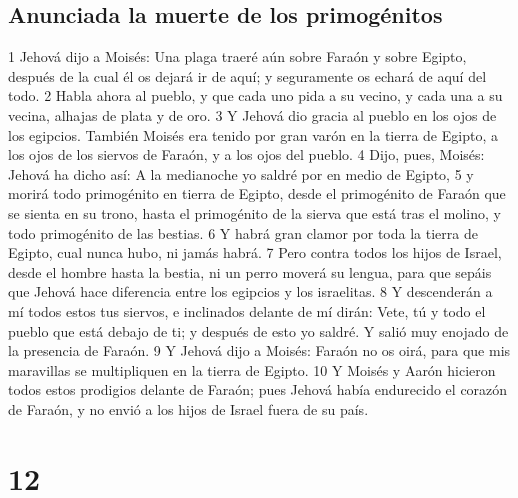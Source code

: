 \section{Anunciada la muerte de los primogénitos}
1 Jehová dijo a Moisés: Una plaga traeré aún sobre Faraón y sobre Egipto, después de la cual él os dejará ir de aquí; y seguramente os echará de aquí del todo.
2 Habla ahora al pueblo, y que cada uno pida a su vecino, y cada una a su vecina, alhajas de plata y de oro.
3 Y Jehová dio gracia al pueblo en los ojos de los egipcios. También Moisés era tenido por gran varón en la tierra de Egipto, a los ojos de los siervos de Faraón, y a los ojos del pueblo.
4 Dijo, pues, Moisés: Jehová ha dicho así: A la medianoche yo saldré por en medio de Egipto,
5 y morirá todo primogénito en tierra de Egipto, desde el primogénito de Faraón que se sienta en su trono, hasta el primogénito de la sierva que está tras el molino, y todo primogénito de las bestias.
6 Y habrá gran clamor por toda la tierra de Egipto, cual nunca hubo, ni jamás habrá.
7 Pero contra todos los hijos de Israel, desde el hombre hasta la bestia, ni un perro moverá su lengua, para que sepáis que Jehová hace diferencia entre los egipcios y los israelitas.
8 Y descenderán a mí todos estos tus siervos, e inclinados delante de mí dirán: Vete, tú y todo el pueblo que está debajo de ti; y después de esto yo saldré. Y salió muy enojado de la presencia de Faraón.
9 Y Jehová dijo a Moisés: Faraón no os oirá, para que mis maravillas se multipliquen en la tierra de Egipto.
10 Y Moisés y Aarón hicieron todos estos prodigios delante de Faraón; pues Jehová había endurecido el corazón de Faraón, y no envió a los hijos de Israel fuera de su país.

\chapter{12}

